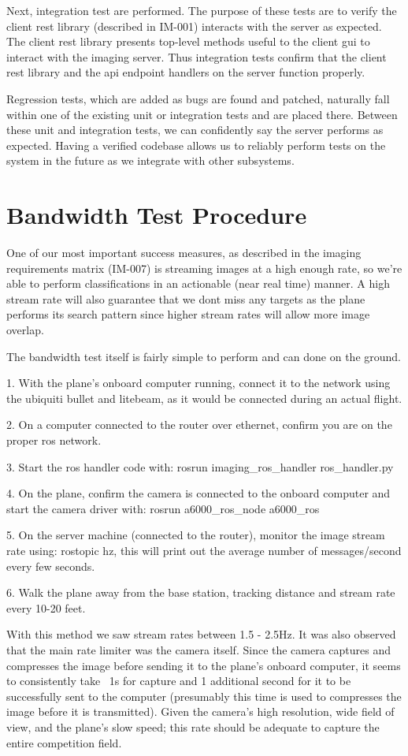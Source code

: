 \documentclass[]{auvsi_doc}
\begin{document}
Next, integration test are performed. The purpose of these tests are to verify the
client rest library (described in IM-001) interacts with the server as expected.
The client rest library presents top-level methods useful to the client gui to 
interact with the imaging server. Thus integration tests confirm that the client
rest library and the api endpoint handlers on the server function properly.

Regression tests, which are added as bugs are found and patched, naturally fall
within one of the existing unit or integration tests and are placed there. Between 
these unit and integration tests, we can confidently say the server performs
as expected. Having a verified codebase allows us to reliably perform tests on 
the system in the future as we integrate with other subsystems.

\section{Bandwidth Test Procedure}

One of our most important success measures, as described in the imaging requirements
matrix (IM-007) is streaming images at a high enough rate, so we're able to perform
classifications in an actionable (near real time) manner. A high stream rate will 
also guarantee that we dont miss any targets as the plane performs its search pattern
since higher stream rates will allow more image overlap. 

The bandwidth test itself is fairly simple to perform and can done on the ground.

1. With the plane's onboard computer running, connect it to the network using
the ubiquiti bullet and litebeam, as it would be connected during an actual flight.

2. On a computer connected to the router over ethernet, confirm you are on the proper ros network.

3. Start the ros handler code with: rosrun imaging\_ros\_handler ros\_handler.py

4. On the plane, confirm the camera is connected to the onboard computer and start
the camera driver with: rosrun a6000\_ros\_node a6000\_ros

5. On the server machine (connected to the router), monitor the image stream rate
using: rostopic hz, this will print out the average number of messages/second every 
few seconds.

6. Walk the plane away from the base station, tracking distance and stream rate
every 10-20 feet.

With this method we saw stream rates between 1.5 - 2.5Hz. It was also observed
that the main rate limiter was the camera itself. Since the camera captures
and compresses the image before sending it to the plane's onboard computer, it 
seems to consistently take ~1s for capture and 1 additional second for it to 
be successfully sent to the computer (presumably this time is used to compresses 
the image before it is transmitted). Given the camera's high resolution, wide
field of view, and the plane's slow speed; this rate should be adequate to capture 
the entire competition field.
\end{document}
